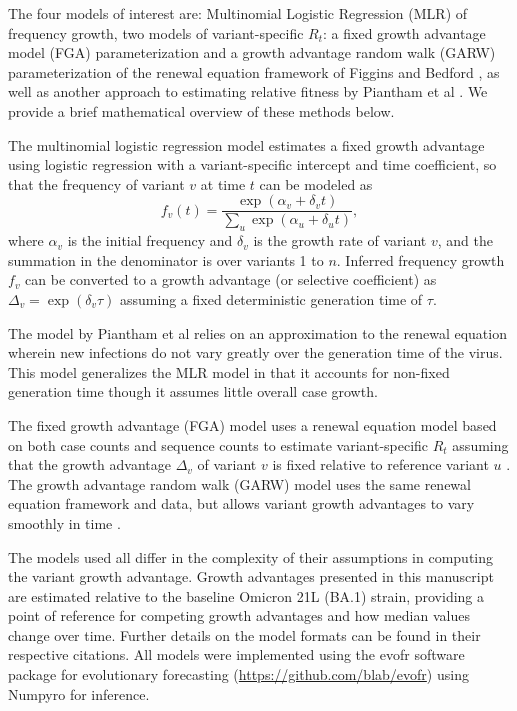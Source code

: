 \documentclass[10pt,letterpaper]{article}
\begin{document}
The four models of interest are: Multinomial Logistic Regression (MLR) of frequency growth, two models of variant-specific $R_t$: a fixed growth advantage model (FGA) parameterization and a growth advantage random walk (GARW) parameterization of the renewal equation framework of Figgins and Bedford \cite{figgins2022sars}, as well as another approach to estimating relative fitness by Piantham et al \cite{piantham2021estimating}.
We provide a brief mathematical overview of these methods below.

The multinomial logistic regression model estimates a fixed growth advantage using logistic regression with a variant-specific intercept and time coefficient, so that the frequency of variant $v$ at time $t$ can be modeled as
\begin{equation}
    f_{v}(t) = \frac{\exp(\alpha_{v} + \delta_{v} t)}{\sum_{u} \exp(\alpha_{u} + \delta_{u} t)},
\end{equation}
where $\alpha_v$ is the initial frequency and $\delta_v$ is the growth rate of variant $v$, and the summation in the denominator is over variants 1 to $n$.
Inferred frequency growth $f_v$ can be converted to a growth advantage (or selective coefficient) as $\Delta_{v} = \exp(\delta_{v} \tau)$ assuming a fixed deterministic  generation time of $\tau$.

The model by Piantham et al \cite{piantham2021estimating} relies on an approximation to the renewal equation wherein new infections do not vary greatly over the generation time of the virus.
This model generalizes the MLR model in that it accounts for non-fixed generation time though it assumes little overall case growth.

The fixed growth advantage (FGA) model uses a renewal equation model based on both case counts and sequence counts to estimate variant-specific $R_t$ assuming that the growth advantage $\Delta_{v}$ of variant $v$ is fixed relative to reference variant $u$ \cite{figgins2022sars}.
The growth advantage random walk (GARW) model uses the same renewal equation framework and data, but allows variant growth advantages to vary smoothly in time \cite{figgins2022sars}.

The models used all differ in the complexity of their assumptions in computing the variant growth advantage.
Growth advantages presented in this manuscript are estimated relative to the baseline Omicron 21L (BA.1) strain, providing a point of reference for competing growth advantages and how median values change over time.
Further details on the model formats can be found in their respective citations.
All models were implemented using the evofr software package for evolutionary forecasting (\href{https://github.com/blab/evofr}{https://github.com/blab/evofr}) using Numpyro for inference.
\end{document}

